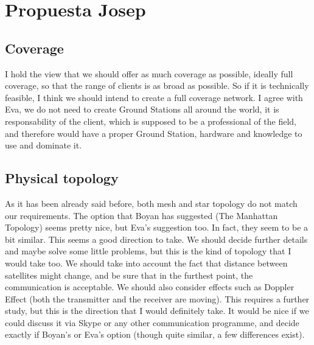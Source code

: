 \section{Propuesta Josep}
\subsection{Coverage}
I hold the view that we should offer as much coverage as possible, ideally full coverage, so that the range of clients is as broad as possible. So if it is technically feasible, I think we should intend to create a full coverage network. I agree with Eva, we do not need to create Ground Stations all around the world, it is responsability of the client, which is supposed to be a professional of the field, and therefore would have a proper Ground Station, hardware and knowledge to use and dominate it.
\subsection{Physical topology}
As it has been already said before, both mesh and star topology do not match our requirements. The option that Boyan has suggested (The Manhattan Topology) seems pretty nice, but Eva's suggestion too. In fact, they seem to be a bit similar. This seems a good direction to take. We should decide further details and maybe solve some little problems, but this is the kind of topology that I would take too. We should take into account the fact that distance between satellites might change, and be sure that in the furthest point, the communication is acceptable. We should also consider effects such as Doppler Effect (both the transmitter and the receiver are moving). This requires a further study, but this is the direction that I would definitely take. It would be nice if we could discuss it via Skype or any other communication programme, and decide exactly if Boyan's or Eva's option (though quite similar, a few differences exist).

